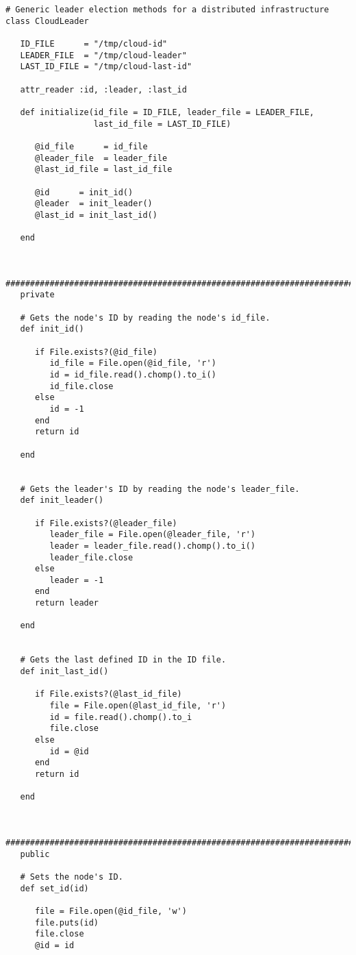 \begin{lstlisting}
# Generic leader election methods for a distributed infrastructure
class CloudLeader
   
   ID_FILE      = "/tmp/cloud-id"
   LEADER_FILE  = "/tmp/cloud-leader"
   LAST_ID_FILE = "/tmp/cloud-last-id"
   
   attr_reader :id, :leader, :last_id
   
   def initialize(id_file = ID_FILE, leader_file = LEADER_FILE,
                  last_id_file = LAST_ID_FILE)
   
      @id_file      = id_file
      @leader_file  = leader_file
      @last_id_file = last_id_file 
      
      @id      = init_id()
      @leader  = init_leader()
      @last_id = init_last_id()
      
   end
   
   
   #############################################################################
   private
   
   # Gets the node's ID by reading the node's id_file.
   def init_id()
      
      if File.exists?(@id_file)
         id_file = File.open(@id_file, 'r')
         id = id_file.read().chomp().to_i()
         id_file.close
      else
         id = -1
      end
      return id
   
   end
   
   
   # Gets the leader's ID by reading the node's leader_file.
   def init_leader()
   
      if File.exists?(@leader_file)
         leader_file = File.open(@leader_file, 'r')
         leader = leader_file.read().chomp().to_i()
         leader_file.close
      else
         leader = -1
      end
      return leader
   
   end
   
   
   # Gets the last defined ID in the ID file.
   def init_last_id()

      if File.exists?(@last_id_file)
         file = File.open(@last_id_file, 'r')
         id = file.read().chomp().to_i
         file.close
      else
         id = @id
      end
      return id

   end
   
   
   #############################################################################
   public
   
   # Sets the node's ID.
   def set_id(id)
   
      file = File.open(@id_file, 'w')
      file.puts(id)
      file.close
      @id = id
      

\end{lstlisting}

